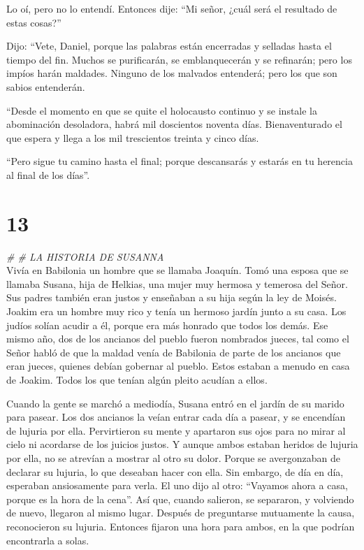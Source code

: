  Lo oí, pero no lo entendí. Entonces dije: ``Mi señor,
¿cuál será el resultado de estas cosas?''

 Dijo: ``Vete, Daniel, porque las palabras están
encerradas y selladas hasta el tiempo del fin.  Muchos se
purificarán, se emblanquecerán y se refinarán; pero los impíos harán
maldades. Ninguno de los malvados entenderá; pero los que son sabios
entenderán.

 ``Desde el momento en que se quite el holocausto
continuo y se instale la abominación desoladora, habrá mil doscientos
noventa días.  Bienaventurado el que espera y llega a los
mil trescientos treinta y cinco días.

 ``Pero sigue tu camino hasta el final; porque
descansarás y estarás en tu herencia al final de los días''.

\hypertarget{section-12}{%
\section{13}\label{section-12}}

\emph{\# \# LA HISTORIA DE SUSANNA}\\

 Vivía en Babilonia un hombre que se llamaba Joaquín.
 Tomó una esposa que se llamaba Susana, hija de Helkias,
una mujer muy hermosa y temerosa del Señor.  Sus padres
también eran justos y enseñaban a su hija según la ley de Moisés.
 Joakim era un hombre muy rico y tenía un hermoso jardín
junto a su casa. Los judíos solían acudir a él, porque era más honrado
que todos los demás.  Ese mismo año, dos de los ancianos
del pueblo fueron nombrados jueces, tal como el Señor habló de que la
maldad venía de Babilonia de parte de los ancianos que eran jueces,
quienes debían gobernar al pueblo.  Estos estaban a menudo
en casa de Joakim. Todos los que tenían algún pleito acudían a ellos.

 Cuando la gente se marchó a mediodía, Susana entró en el
jardín de su marido para pasear.  Los dos ancianos la
veían entrar cada día a pasear, y se encendían de lujuria por ella.
 Pervirtieron su mente y apartaron sus ojos para no mirar
al cielo ni acordarse de los juicios justos.  Y aunque
ambos estaban heridos de lujuria por ella, no se atrevían a mostrar al
otro su dolor.  Porque se avergonzaban de declarar su
lujuria, lo que deseaban hacer con ella.  Sin embargo, de
día en día, esperaban ansiosamente para verla.  El uno
dijo al otro: ``Vayamos ahora a casa, porque es la hora de la cena''.
 Así que, cuando salieron, se separaron, y volviendo de
nuevo, llegaron al mismo lugar. Después de preguntarse mutuamente la
causa, reconocieron su lujuria. Entonces fijaron una hora para ambos, en
la que podrían encontrarla a solas.

